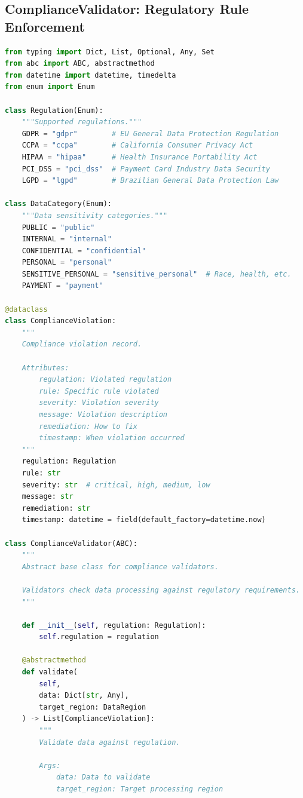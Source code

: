 \subsection{ComplianceValidator: Regulatory Rule Enforcement}

\begin{lstlisting}[language=Python, caption={Compliance Validator with Regulatory Rules}]
from typing import Dict, List, Optional, Any, Set
from abc import ABC, abstractmethod
from datetime import datetime, timedelta
from enum import Enum

class Regulation(Enum):
    """Supported regulations."""
    GDPR = "gdpr"        # EU General Data Protection Regulation
    CCPA = "ccpa"        # California Consumer Privacy Act
    HIPAA = "hipaa"      # Health Insurance Portability Act
    PCI_DSS = "pci_dss"  # Payment Card Industry Data Security
    LGPD = "lgpd"        # Brazilian General Data Protection Law

class DataCategory(Enum):
    """Data sensitivity categories."""
    PUBLIC = "public"
    INTERNAL = "internal"
    CONFIDENTIAL = "confidential"
    PERSONAL = "personal"
    SENSITIVE_PERSONAL = "sensitive_personal"  # Race, health, etc.
    PAYMENT = "payment"

@dataclass
class ComplianceViolation:
    """
    Compliance violation record.

    Attributes:
        regulation: Violated regulation
        rule: Specific rule violated
        severity: Violation severity
        message: Violation description
        remediation: How to fix
        timestamp: When violation occurred
    """
    regulation: Regulation
    rule: str
    severity: str  # critical, high, medium, low
    message: str
    remediation: str
    timestamp: datetime = field(default_factory=datetime.now)

class ComplianceValidator(ABC):
    """
    Abstract base class for compliance validators.

    Validators check data processing against regulatory requirements.
    """

    def __init__(self, regulation: Regulation):
        self.regulation = regulation

    @abstractmethod
    def validate(
        self,
        data: Dict[str, Any],
        target_region: DataRegion
    ) -> List[ComplianceViolation]:
        """
        Validate data against regulation.

        Args:
            data: Data to validate
            target_region: Target processing region


\end{lstlisting}
